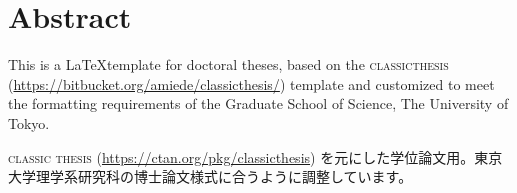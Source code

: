\begingroup

\chapter*{Abstract}
This is a \LaTeX template for doctoral theses, based on the \textsc{classicthesis} (\url{https://bitbucket.org/amiede/classicthesis/}) template and customized to meet the formatting requirements of the Graduate School of Science, The University of Tokyo.

\begin{CJK}{UTF8}{ipxm}\textsc{classic thesis} (\url{https://ctan.org/pkg/classicthesis}) を元にした学位論文用。東京大学理学系研究科の博士論文様式に合うように調整しています。\end{CJK}
%

\endgroup
